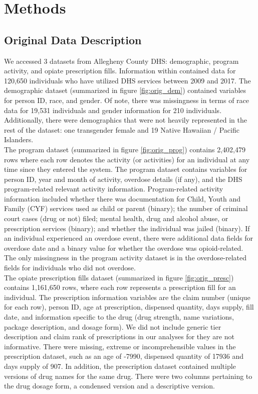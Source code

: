 \documentclass[twoside,10.5pt]{article}
\begin{document}
\section{Methods}
\subsection{Original Data Description}
We accessed 3 datasets from Allegheny County DHS: demographic, program activity, and opiate prescription fills. Information within contained data for 120,650 individuals who have utilized DHS services between 2009 and 2017. The demographic dataset (summarized in figure \ref{fig:orig_dem}) contained variables for person ID, race, and gender. Of note, there was missingness in terms of race data for 19,531 individuals and gender information for 210 individuals. Additionally, there were demographics that were not heavily represented in the rest of the dataset: one transgender female and 19 Native Hawaiian / Pacific Islanders. \\

The program dataset (summarized in figure \ref{fig:orig_prog}) contains 2,402,479 rows where each row denotes the activity (or activities) for an individual at any time since they entered the system. The program dataset contains variables for person ID, year and month of activity, overdose details (if any), and the DHS program-related relevant activity information. Program-related activity information included whether there was documentation for Child, Youth and Family (CYF) services used as child or parent (binary); the number of criminal court cases (drug or not) filed; mental health, drug and alcohol abuse, or prescription services (binary); and whether the individual was jailed (binary). If an individual experienced an overdose event, there were additional data fields for overdose date and a binary value for whether the overdose was opioid-related. The only missingness in the program activity dataset is in the overdose-related fields for individuals who did not overdose. \\

The opiate prescription fills dataset (summarized in figure \ref{fig:orig_presc}) contains 1,161,650 rows, where each row represents a prescription fill for an individual. The prescription information variables are the claim number (unique for each row), person ID, age at prescription, dispensed quantity, days supply, fill date, and information specific to the drug (drug strength, name variations, package description, and dosage form). We did not include generic tier description and claim rank of prescriptions in our analyses for they are not informative. There were missing, extreme or incomprehensible values in the prescription dataset, such as an age of -7990, dispensed quantity of 17936 and days supply of 907. In addition, the prescription dataset contained multiple versions of drug names for the same drug. There were two columns pertaining to the drug dosage form, a condensed version and a descriptive version.
\end{document}
